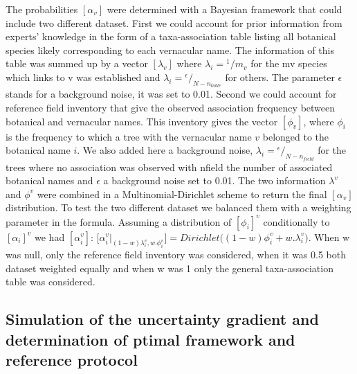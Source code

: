 \documentclass[fleqn,10pt]{ArtEcoFoG} %
\begin{document}
The probabilities \([\alpha_v]\) were determined with a Bayesian
framework that could include two different dataset. First we could
account for prior information from experts' knowledge in the form of a
taxa-association table listing all botanical species likely
corresponding to each vernacular name. The information of this table was
summed up by a vector \([\lambda_v]\) where \(\lambda_i={}^1/m_v\) for
the mv species which links to v was established and
\(\lambda_i={}^\epsilon\big/_{N-n_{table}}\) for others. The parameter
\(\epsilon\) stands for a background noise, it was set to 0.01. Second
we could account for reference field inventory that give the observed
association frequency between botanical and vernacular names. This
inventory gives the vector \([\phi_v]\), where \(\phi_i\) is the
frequency to which a tree with the vernacular name \(v\) belonged to the
botanical name \(i\). We also added here a background noise,
\(\lambda_i={}^\epsilon\big/_{N-n_{field}}\) for the trees where no
association was observed with nfield the number of associated botanical
names and \(\epsilon\) a background noise set to 0.01. The two
information \(\lambda^v\) and \(\phi^v\) were combined in a
Multinomial-Dirichlet scheme \citep{McCarthy2007} to return the final
\([\alpha_v]\) distribution. To test the two different dataset we
balanced them with a weighting parameter in the formula. Assuming a
distribution of \([\phi_i]^v\) conditionally to \([\alpha_i]^v\) we had
\([\alpha_i^v]\):
\(\Big[\alpha_i^v | _{(1-w)\lambda_i^v ,w.\phi_i^v}\Big] =Dirichlet\Big((1-w)\phi_i^v+w.\lambda_i^v\Big)\).
When w was null, only the reference field inventory was considered, when
it was 0.5 both dataset weighted equally and when w was 1 only the
general taxa-association table was considered.

\subsection{Simulation of the uncertainty gradient and determination of
ptimal framework and reference
protocol}\label{simulation-of-the-uncertainty-gradient-and-determination-of-ptimal-framework-and-reference-protocol}
\end{document}
